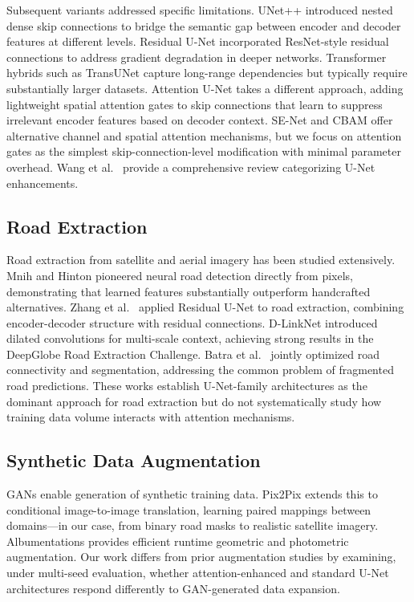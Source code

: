 \documentclass[conference]{IEEEtran}
\begin{document}
Subsequent variants addressed specific limitations. UNet++ \cite{b5} introduced nested dense skip connections to bridge the semantic gap between encoder and decoder features at different levels. Residual U-Net \cite{b6} incorporated ResNet-style \cite{b7} residual connections to address gradient degradation in deeper networks. Transformer hybrids such as TransUNet \cite{b8} capture long-range dependencies but typically require substantially larger datasets. Attention U-Net \cite{b2} takes a different approach, adding lightweight spatial attention gates to skip connections that learn to suppress irrelevant encoder features based on decoder context. SE-Net \cite{b9} and CBAM \cite{b10} offer alternative channel and spatial attention mechanisms, but we focus on attention gates as the simplest skip-connection-level modification with minimal parameter overhead. Wang et al.\ \cite{b11} provide a comprehensive review categorizing U-Net enhancements.

\subsection{Road Extraction}

Road extraction from satellite and aerial imagery has been studied extensively. Mnih and Hinton \cite{b12} pioneered neural road detection directly from pixels, demonstrating that learned features substantially outperform handcrafted alternatives. Zhang et al.\ \cite{b6} applied Residual U-Net to road extraction, combining encoder-decoder structure with residual connections. D-LinkNet \cite{b13} introduced dilated convolutions for multi-scale context, achieving strong results in the DeepGlobe Road Extraction Challenge. Batra et al.\ \cite{b14} jointly optimized road connectivity and segmentation, addressing the common problem of fragmented road predictions. These works establish U-Net-family architectures as the dominant approach for road extraction but do not systematically study how training data volume interacts with attention mechanisms.

\subsection{Synthetic Data Augmentation}

GANs \cite{b15} enable generation of synthetic training data. Pix2Pix \cite{b3} extends this to conditional image-to-image translation, learning paired mappings between domains---in our case, from binary road masks to realistic satellite imagery. Albumentations \cite{b16} provides efficient runtime geometric and photometric augmentation. %
Our work differs from prior augmentation studies by examining, under multi-seed evaluation, whether attention-enhanced and standard U-Net architectures respond differently to GAN-generated data expansion.
\end{document}
